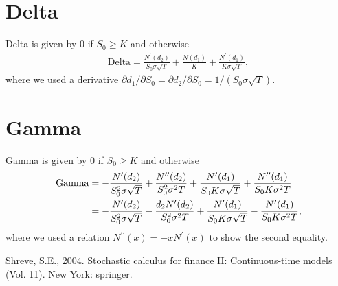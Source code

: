 \documentclass{article}
\begin{document}
\section*{Delta}


Delta is given by
$0$ if $S_0 \geq K$ and otherwise
\begin{align}
    \text{Delta}
        = \frac{N^\prime(d_2)}{S_0 \sigma \sqrt{T}}
            + \frac{N(d_1)}{K}
            + \frac{N^\prime(d_1)}{K \sigma \sqrt{T}} ,
\end{align}
where
we used a derivative $\partial d_1 / \partial S_0 = \partial d_2 / \partial S_0 = 1 / (S_0 \sigma \sqrt{T})$.


\section*{Gamma}


Gamma is given by
$0$ if $S_0 \geq K$ and otherwise
\begin{align}
    \text{Gamma}
        & = - \frac{N^\prime(d_2)}{S_0^2 \sigma \sqrt{T}}
            + \frac{N^{\prime\prime}(d_2)}{S_0^2 \sigma^2 T}
            + \frac{N^\prime(d_1)}{S_0 K \sigma \sqrt{T}}
            + \frac{N^{\prime\prime}(d_1)}{S_0 K \sigma^2 T} \notag \\
        & = - \frac{N^\prime(d_2)}{S_0^2 \sigma \sqrt{T}}
            - \frac{d_2 N^\prime(d_2)}{S_0^2 \sigma^2 T}
            + \frac{N^\prime(d_1)}{S_0 K \sigma \sqrt{T}}
            - \frac{N^\prime(d_1)}{S_0 K \sigma^2 T} ,
    \label{eq:gamma}
\end{align}
where we used a relation $N^{\prime\prime}(x) = - x N^\prime(x)$ to show the second equality.


\begin{thebibliography}{1}
 Shreve, S.E., 2004. Stochastic calculus for finance II: Continuous-time models (Vol. 11). New York: springer.
\end{thebibliography}
\end{document}
